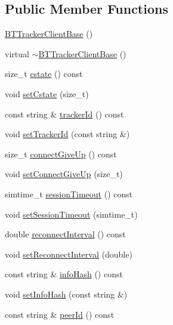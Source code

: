 \subsection*{Public Member Functions}
\begin{DoxyCompactItemize}
\item 
\hyperlink{classBTTrackerClientBase_af2daf873e282ca0f12a34ba657d801de}{B\+T\+Tracker\+Client\+Base} ()
\item 
virtual \hyperlink{classBTTrackerClientBase_a52ebc86c77b27289b4ac3d3131b6e9d3}{$\sim$\+B\+T\+Tracker\+Client\+Base} ()
\item 
size\+\_\+t \hyperlink{classBTTrackerClientBase_a65879dbc1ec398c124f27c5d4ca63552}{cstate} () const 
\item 
void \hyperlink{classBTTrackerClientBase_a4cd61fb7ac4fed418aceb9ec76489f70}{set\+Cstate} (size\+\_\+t)
\item 
const string \& \hyperlink{classBTTrackerClientBase_a25d94d6851c1a20566a73fc8bb79fae4}{tracker\+Id} () const 
\item 
void \hyperlink{classBTTrackerClientBase_a1e34cc7545623b3e60e81f82d8321f7f}{set\+Tracker\+Id} (const string \&)
\item 
size\+\_\+t \hyperlink{classBTTrackerClientBase_a3e1eee0a4b600eb25e4406af05c86822}{connect\+Give\+Up} () const 
\item 
void \hyperlink{classBTTrackerClientBase_aadbed5705c9858f1d90050dbfeca5559}{set\+Connect\+Give\+Up} (size\+\_\+t)
\item 
simtime\+\_\+t \hyperlink{classBTTrackerClientBase_a65eb496c2f438e0a9a67b5adb83c1ffc}{session\+Timeout} () const 
\item 
void \hyperlink{classBTTrackerClientBase_a85374136d41a2df83f5ffba345d8046b}{set\+Session\+Timeout} (simtime\+\_\+t)
\item 
double \hyperlink{classBTTrackerClientBase_af5b16a044b06fe75dd8bc8c399bc8b29}{reconnect\+Interval} () const 
\item 
void \hyperlink{classBTTrackerClientBase_a6c41e7aeaa0633a2742bb7ec558ac28f}{set\+Reconnect\+Interval} (double)
\item 
const string \& \hyperlink{classBTTrackerClientBase_ad56587246469f660fedef3c50c10554d}{info\+Hash} () const 
\item 
void \hyperlink{classBTTrackerClientBase_a6f764b043ac1aba4937c02818b2aa8e5}{set\+Info\+Hash} (const string \&)
\item 
const string \& \hyperlink{classBTTrackerClientBase_aaa2e7b0d4d3770dedd7baff0fbd2da45}{peer\+Id} () const 

\end{DoxyCompactItemize}
